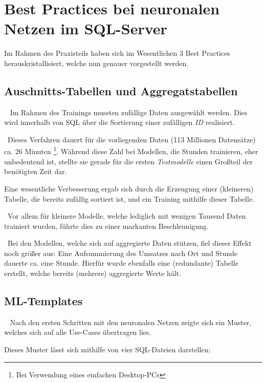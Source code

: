 \section[Best Practices]{Best Practices bei neuronalen Netzen im SQL-Server}

Im Rahmen des Praxisteils haben sich im Wesentlichen 3 Best Practices herauskristallisiert, welche nun genauer vorgestellt werden. 

\subsection{Auschnitts-Tabellen und Aggregatstabellen} ~\newline
Im Rahmen des Trainings mussten zufällige Daten ausgewählt werden. Dies wird innerhalb von SQL über die Sortierung einer zufälligen \textit{ID} realisiert. 

~\newline Dieses Verfahren dauert für die vorliegenden Daten (113 Millionen Datensätze) ca. 26 Minuten \footnote{Bei Verwendung eines einfachen Desktop-PCs}. Während diese Zahl bei Modellen, die Stunden trainieren, eher unbedeutend ist, stellte sie gerade für die ersten \textit{Testmodelle} einen Großteil der benötigten Zeit dar. 

Eine wesentliche Verbesserung ergab sich durch die Erzeugung einer (kleineren) Tabelle, die bereits zufällig sortiert ist, und ein Training mithilfe dieser Tabelle. 

~\newline Vor allem für kleinere Modelle, welche lediglich mit wenigen Tausend Daten trainiert wurden, führte dies zu einer markanten Beschleunigung.

~\newline Bei den Modellen, welche sich auf aggregierte Daten stützen, fiel dieser Effekt noch größer aus: Eine Aufsummierung des Umsatzes nach Ort und Stunde dauerte ca. eine Stunde. Hierfür wurde ebenfalls eine (redundante) Tabelle erstellt, welche bereits (mehrere) aggregierte Werte hält. 

\subsection{ML-Templates} ~\newline
Nach den ersten Schritten mit den neuronalen Netzen zeigte sich ein Muster, welches sich auf alle Use-Cases übertragen lies. 

Dieses Muster lässt sich mithilfe von vier SQL-Dateien darstellen:

